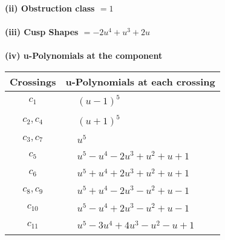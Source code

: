 \documentclass[1p]{elsarticle_modified}
\theoremstyle{definition}
\begin{document}
\flushleft \textbf{(ii) Obstruction class $= 1$}\\~\\
\flushleft \textbf{(iii) Cusp Shapes $= -2 u^4+u^3+2 u$}\\~\\
\newpage\renewcommand{\arraystretch}{1}
\flushleft \textbf{(iv) u-Polynomials at the component}\newline \\
\begin{tabular}{m{50pt}|m{274pt}}
Crossings & \hspace{64pt}u-Polynomials at each crossing \\
\hline $$\begin{aligned}c_{1}\end{aligned}$$&$\begin{aligned}
&(u-1)^5
\end{aligned}$\\
\hline $$\begin{aligned}c_{2},c_{4}\end{aligned}$$&$\begin{aligned}
&(u+1)^5
\end{aligned}$\\
\hline $$\begin{aligned}c_{3},c_{7}\end{aligned}$$&$\begin{aligned}
&u^5
\end{aligned}$\\
\hline $$\begin{aligned}c_{5}\end{aligned}$$&$\begin{aligned}
&u^5- u^4-2 u^3+u^2+u+1
\end{aligned}$\\
\hline $$\begin{aligned}c_{6}\end{aligned}$$&$\begin{aligned}
&u^5+u^4+2 u^3+u^2+u+1
\end{aligned}$\\
\hline $$\begin{aligned}c_{8},c_{9}\end{aligned}$$&$\begin{aligned}
&u^5+u^4-2 u^3- u^2+u-1
\end{aligned}$\\
\hline $$\begin{aligned}c_{10}\end{aligned}$$&$\begin{aligned}
&u^5- u^4+2 u^3- u^2+u-1
\end{aligned}$\\
\hline $$\begin{aligned}c_{11}\end{aligned}$$&$\begin{aligned}
&u^5-3 u^4+4 u^3- u^2- u+1
\end{aligned}$\\
\hline
\end{tabular}\\~\\
\end{document}
